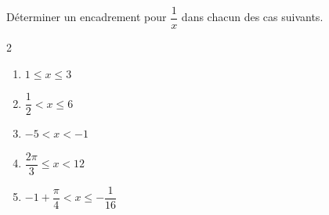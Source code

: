 \begin{exo}{}
	Déterminer un encadrement pour $\dfrac{1}{x}$ dans chacun des cas suivants.
	\vspace*{-2mm}
	\begin{multicols}{2}
	\begin{enumerate}[itemsep=2mm]
		\item $1 \le x \le 3$
		\item $\dfrac{1}{2} < x \le 6$
		\item $-5 < x < -1$
		\item $\dfrac{2\pi}{3} \le x < 12$
		\item $-1 + \dfrac{\pi}{4} < x \le -\dfrac{1}{16}$
	\end{enumerate}
	\end{multicols}\vspace*{-2mm}
\end{exo}
